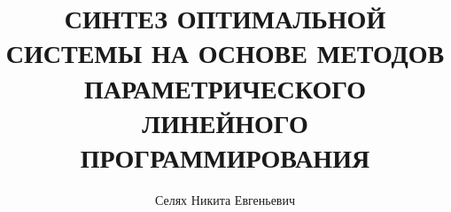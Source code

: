 \documentclass[14pt,a4paper]{extreport}
\begin{document}

\title{СИНТЕЗ ОПТИМАЛЬНОЙ СИСТЕМЫ НА ОСНОВЕ МЕТОДОВ ПАРАМЕТРИЧЕСКОГО ЛИНЕЙНОГО ПРОГРАММИРОВАНИЯ}

\author{Селях Никита Евгеньевич}







\BSUtitle



\tableofcontents




















\label{lastpage}
\end{document}
